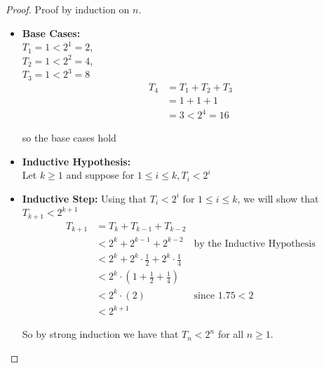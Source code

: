 \documentclass[11pt]{article}
\theoremstyle{definition}
\theoremstyle{definition}
\theoremstyle{definition}
\begin{document}
\begin{proof}

Proof by induction on $n$. 
\begin{itemize}
\item \textbf{Base Cases:}  \\
$T_{1} =1 < 2^1 = 2 $,  \\
$T_{2} =1 < 2^2 = 4 $,  \\
$T_{3} =1 < 2^3 = 8 $ 
\begin{align*}
T_{4} &=T_{1}+T_{2}+T_{3} \\
&=1+1+1 \\
&=3 < 2^4 = 16  
\end{align*}

so the base cases hold

\item \textbf{Inductive Hypothesis:} \\
Let $k \geq 1$ and suppose for $1 \leq i \leq k, T_{i} < 2^i $ 


\item \textbf{Inductive Step:} Using that $ T_{i} < 2^i $ for   $1 \leq i \leq k$, we will show that $T_{k+1} < 2^{k+1} $
\begin{align*}
T_{k+1}&= T_{k}+T_{k-1}+T_{k-2} \\
&< 2^k +2^{k-1}+2^{k-2} &\text{by the Inductive Hypothesis} \\
&<2^k +2^k\cdot \frac{1}{2} +2^k\cdot \frac{1}{4} \\
&<2^k \cdot (1+ \frac{1}{2} + \frac{1}{4}) \\
&<2^k \cdot (2) &\text{since $1.75<2$} \\
&<2^{k+1} 
\end{align*}

So by strong induction we have that $T_{n} < 2^n$ for all $n\geq 1$. 
\end{itemize}

\end{proof}



\newpage
\end{document}
